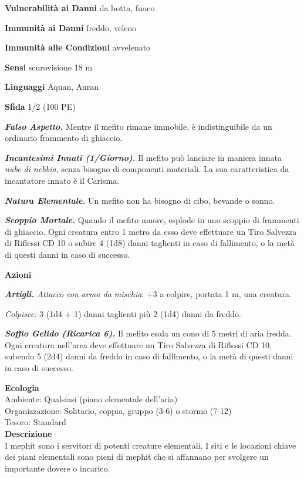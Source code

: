 \begin{multicols}{2}
\textbf{Vulnerabilità ai Danni} da botta, fuoco

\textbf{Immunità ai Danni} freddo, veleno

\textbf{Immunità alle Condizioni} avvelenato

\textbf{Sensi} scurovisione 18 m

\textbf{Linguaggi} Aquan, Auran

\textbf{Sfida} 1/2 (100 PE)

\emph{\textbf{Falso Aspetto.}} Mentre il mefito rimane immobile, è
indistinguibile da un ordinario frammento di ghiaccio.

\emph{\textbf{Incantesimi Innati (1/Giorno).}} Il mefito può lanciare in
maniera innata \emph{nube di nebbia}, senza bisogno di componenti
materiali. La sua caratteristica da incantatore innato è il Carisma.

\emph{\textbf{Natura Elementale.}} Un mefito non ha bisogno di cibo,
bevande o sonno.

\emph{\textbf{Scoppio Mortale.}} Quando il mefito muore, esplode in uno scoppio di frammenti di ghiaccio. Ogni creatura entro 1 metro da esso deve effettuare un Tiro Salvezza di Riflessi CD 10 o subire 4 (1d8) danni taglienti in caso di fallimento, o la metà di questi danni in caso
di successo.

\textbf{Azioni}

\emph{\textbf{Artigli.} Attacco con arma da mischia}: +3 a colpire,
portata 1 m, una creatura.

\emph{Colpisce:} 3 (1d4 + 1) danni taglienti più 2 (1d4) danni da
freddo.

\emph{\textbf{Soffio Gelido (Ricarica 6).}} Il mefito esala un cono di 5 metri di aria fredda. Ogni creatura nell'area deve effettuare un Tiro Salvezza di Riflessi CD 10, subendo 5 (2d4) danni da freddo in caso di fallimento, o la metà di questi danni in caso di successo.

\textbf{Ecologia}\\
Ambiente: Qualsiasi (piano elementale dell'aria)\\
Organizzazione: Solitario, coppia, gruppo (3-6) o stormo (7-12)\\
Tesoro: Standard\\
\textbf{Descrizione}\\
I mephit sono i servitori di potenti creature elementali. I siti e le locazioni chiave dei piani elementali sono pieni di mephit che si affannano per svolgere un importante dovere o incarico.\\


\end{multicols}

